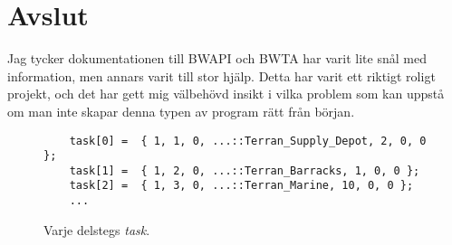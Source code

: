 \documentclass[a4paper,11pt]{article}
\begin{document}
\section{Avslut}
Jag tycker dokumentationen till BWAPI och BWTA har varit lite snål med information, men annars varit till stor hjälp. Detta har varit ett riktigt roligt projekt, och det har gett mig välbehövd insikt i vilka problem som kan uppstå om man inte skapar denna typen av program rätt från början. 

\begin{figure}[b]
\begin{lstlisting}
	task[0] =  { 1, 1, 0, ...::Terran_Supply_Depot, 2, 0, 0 };
	task[1] =  { 1, 2, 0, ...::Terran_Barracks, 1, 0, 0 };
	task[2] =  { 1, 3, 0, ...::Terran_Marine, 10, 0, 0 };
	...
\end{lstlisting}
\caption{Varje delstegs \textit{task}.}
\end{figure}
\end{document}
